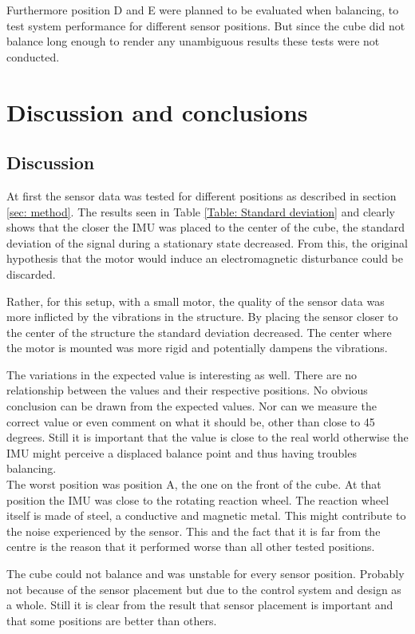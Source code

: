 \documentclass[a4paper,11pt]{kth-mag}
\begin{document}
Furthermore position D and E were planned to be evaluated when balancing, to test system performance for different sensor positions. But since the cube did not balance long enough to render any unambiguous results these tests were not conducted.

\chapter{Discussion and conclusions}

\section{Discussion}
At first the sensor data was tested for different positions as described in section \ref{sec: method}. The results seen in Table \ref{Table: Standard deviation} and clearly shows that the closer the IMU was placed to the center of the cube, the standard deviation of the signal during a stationary state decreased. From this, the original hypothesis that the motor would induce an electromagnetic disturbance could be discarded.

Rather, for this setup, with a small motor, the quality of the sensor data was more inflicted by the vibrations in the structure. By placing the sensor closer to the center of the structure the standard deviation decreased. The center where the motor is mounted was more rigid and potentially dampens the vibrations.

The variations in the expected value is interesting as well. There are no relationship between the values and their respective positions. No obvious conclusion can be drawn from the expected values. Nor can we measure the correct value or even comment on what it should be, other than close to 45 degrees. Still it is important that the value is close to the real world otherwise the IMU might perceive a displaced balance point and thus having troubles balancing.
\\ 

The worst position was position A, the one on the front of the cube. At that position the IMU was close to the rotating reaction wheel. The reaction wheel itself is made of steel, a conductive and magnetic metal. This might contribute to the noise experienced by the sensor. This and the fact that it is far from the centre is the reason that it performed worse than all other tested positions.

The cube could not balance and was unstable for every sensor position. Probably not because of the sensor placement but due to the control system and design as a whole. Still it is clear from the result that sensor placement is important and that some positions are better than others.
\end{document}
